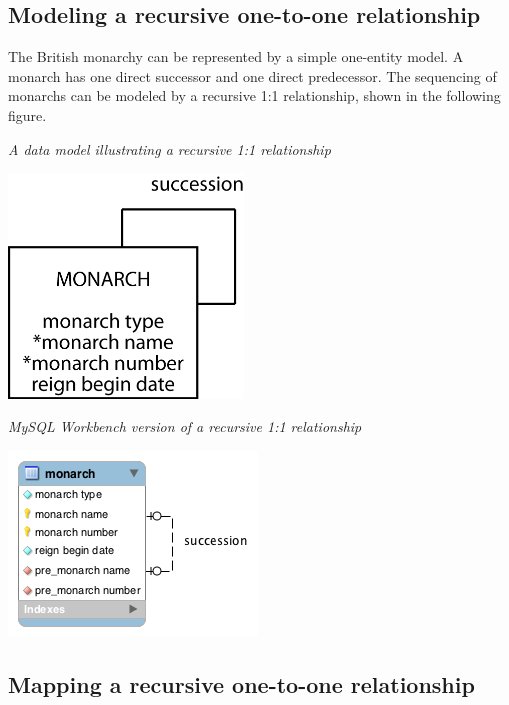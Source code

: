 \documentclass[
]{article}
\begin{document}
\hypertarget{modeling-a-recursive-one-to-one-relationship}{%
\subsection*{Modeling a recursive one-to-one relationship}\label{modeling-a-recursive-one-to-one-relationship}}

The British monarchy can be represented by a simple one-entity model. A
monarch has one direct successor and one direct predecessor. The
sequencing of monarchs can be modeled by a recursive 1:1 relationship,
shown in the following figure.

\emph{A data model illustrating a recursive 1:1 relationship}

\includegraphics[width=2.45833in,height=\textheight]{Figures/Chapter 6/recursive-1-and-1.png}

\emph{MySQL Workbench version of a recursive 1:1 relationship}

\includegraphics{Figures/Chapter 6/recursive-1-and-1-wb.png}

\hypertarget{mapping-a-recursive-one-to-one-relationship}{%
\subsection*{Mapping a recursive one-to-one relationship}\label{mapping-a-recursive-one-to-one-relationship}}
\end{document}
